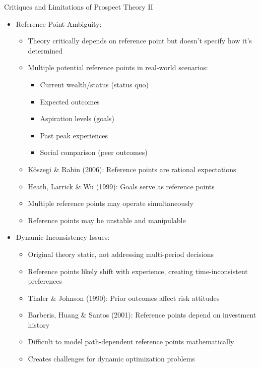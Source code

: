 \documentclass[10pt,handout]{beamer}
\begin{document}
\begin{frame}{Critiques and Limitations of Prospect Theory II}
  \begin{itemize}[<+->]
    \item Reference Point Ambiguity:
      \begin{itemize}
        \item Theory critically depends on reference point but doesn't specify how it's determined
        \item Multiple potential reference points in real-world scenarios:
          \begin{itemize}
            \item Current wealth/status (status quo)
            \item Expected outcomes
            \item Aspiration levels (goals)
            \item Past peak experiences
            \item Social comparison (peer outcomes)
          \end{itemize}
        \item Köszegi \& Rabin (2006): Reference points are rational expectations
        \item Heath, Larrick \& Wu (1999): Goals serve as reference points
        \item Multiple reference points may operate simultaneously
        \item Reference points may be unstable and manipulable
      \end{itemize}
    \item Dynamic Inconsistency Issues:
      \begin{itemize}
        \item Original theory static, not addressing multi-period decisions
        \item Reference points likely shift with experience, creating time-inconsistent preferences
        \item Thaler \& Johnson (1990): Prior outcomes affect risk attitudes
        \item Barberis, Huang \& Santos (2001): Reference points depend on investment history
        \item Difficult to model path-dependent reference points mathematically
        \item Creates challenges for dynamic optimization problems
      \end{itemize}
  \end{itemize}
\end{frame}
\end{document}
